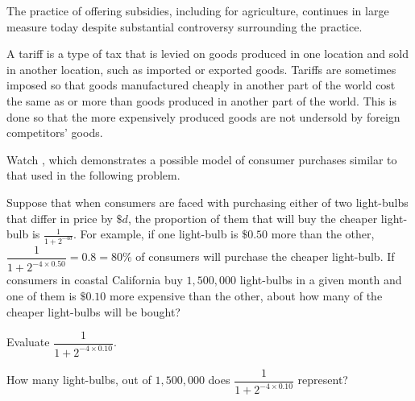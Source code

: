 \documentclass{ximera}
\begin{document}
The practice of offering subsidies, including for agriculture, continues in large measure today despite substantial controversy surrounding the practice.

A tariff is a type of tax that is levied on goods produced in one location and sold in another location, such as imported or exported goods. Tariffs are sometimes imposed so that goods manufactured cheaply in another part of the world cost the same as or more than goods produced in another part of the world. This is done so that the more expensively produced goods are not undersold by foreign competitors' goods.

\begin{question}
Watch , which demonstrates a possible model of consumer purchases similar to that used in the following problem.

Suppose that when consumers are faced with purchasing either of two light-bulbs that differ in price by $\$d$, the proportion of them that will buy the cheaper light-bulb is $\displaystyle \frac{1}{1+2^{-4d}}$.
For example, if one light-bulb is $\$0.50$ more than the other, $\dfrac{1}{1+2^{-4\times 0.50}}=0.8=80\%$ of consumers will purchase the cheaper light-bulb.
If consumers in coastal California buy $1,500,000$ light-bulbs in a given month and one of them is $\$0.10$ more expensive than the other, about how many of the cheaper light-bulbs will be bought?


 \begin{multipleChoice}
    \end{multipleChoice}
\begin{hint}
Evaluate $\dfrac{1}{1+2^{-4\times 0.10}}$.
\end{hint}
\begin{hint}
How many light-bulbs, out of $1,500,000$ does $\dfrac{1}{1+2^{-4\times 0.10}}$ represent?
\end{hint}

\end{question}
\end{document}
